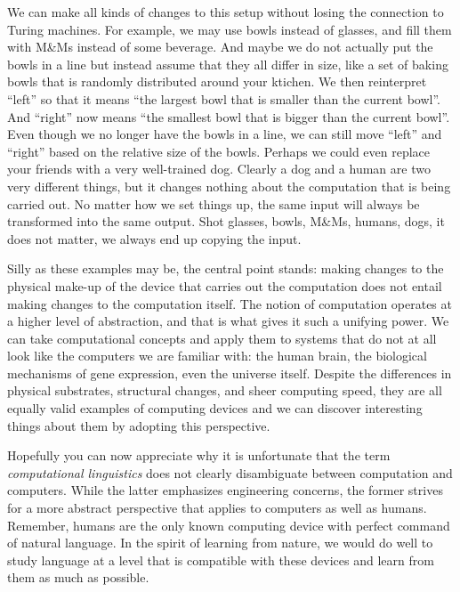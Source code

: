 We can make all kinds of changes to this setup without losing the connection to Turing machines.
For example, we may use bowls instead of glasses, and fill them with M\&Ms instead of some beverage.
And maybe we do not actually put the bowls in a line but instead assume that they all differ in size, like a set of baking bowls that is randomly distributed around your ktichen.
We then reinterpret ``left'' so that it means ``the largest bowl that is smaller than the current bowl''.
And ``right'' now means ``the smallest bowl that is bigger than the current bowl''.
Even though we no longer have the bowls in a line, we can still move ``left'' and ``right'' based on the relative size of the bowls.
Perhaps we could even replace your friends with a very well-trained dog.
Clearly a dog and a human are two very different things, but it changes nothing about the computation that is being carried out.
No matter how we set things up, the same input will always be transformed into the same output.
Shot glasses, bowls, M\&Ms, humans, dogs, it does not matter, we always end up copying the input.

Silly as these examples may be, the central point stands: making changes to the physical make-up of the device that carries out the computation does not entail making changes to the computation itself.
The notion of computation operates at a higher level of abstraction, and that is what gives it such a unifying power.
We can take computational concepts and apply them to systems that do not at all look like the computers we are familiar with: the human brain, the biological mechanisms of gene expression, even the universe itself.
Despite the differences in physical substrates, structural changes, and sheer computing speed, they are all equally valid examples of computing devices and we can  discover interesting things about them by adopting this perspective.

Hopefully you can now appreciate why it is unfortunate that the term \emph{computational linguistics} does not clearly disambiguate between computation and computers.
While the latter emphasizes engineering concerns, the former strives for a more abstract perspective that applies to computers as well as humans.
Remember, humans are the only known computing device with perfect command of natural language.
In the spirit of learning from nature, we would do well to study language at a level that is compatible with these devices and learn from them as much as possible.

